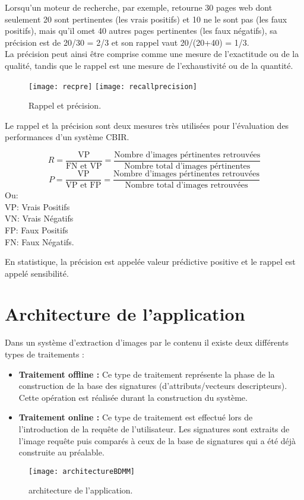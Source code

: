 Lorsqu'un moteur de recherche, par exemple, retourne 30 pages web dont seulement 20 sont pertinentes (les vrais positifs) et 10 ne le sont pas (les faux positifs), mais qu'il omet 40 autres pages pertinentes (les faux négatifs), sa précision est de 20/30 = 2/3 et son rappel vaut 20/(20+40) = 1/3.\\

La précision peut ainsi être comprise comme une mesure de l'exactitude ou de la qualité, tandis que le rappel est une mesure de l'exhaustivité ou de la quantité.\\


\begin{figure}[H]
	\texttt{[image: recpre]} 
	\texttt{[image: recallprecision]} 
	\caption{Rappel et précision.}
\end{figure}
Le rappel et la précision sont deux mesures très utilisées pour l’évaluation des performances d’un système CBIR. 

\begin{equation}
R = \frac{\text{VP}}{\text{FN et VP}} = \frac{\text{Nombre d'images pértinentes retrouvées} }{\text{Nombre total d'images pértinentes}}
\end{equation}
\begin{equation}
P = \frac{\text{VP}}{\text{VP et FP}} = \frac{\text{Nombre d'images pértinentes retrouvées}}{\text{Nombre total d'images retrouvées}}
\end{equation}
Ou: \\
VP: Vrais Positifs\\
VN: Vrais Négatifs\\
FP: Faux Positifs\\
FN: Faux Négatifs.
 
En statistique, la précision est appelée valeur prédictive positive et  le rappel est appelé sensibilité.

\section{Architecture de l’application}
Dans un système d’extraction d’images par le contenu il existe deux différents types de traitements :
\begin{itemize}
	\item \textbf{Traitement offline :}
	Ce type de traitement représente la phase de la construction de la base des signatures (d’attributs/vecteurs descripteurs).
	Cette opération est réalisée durant la construction du système.
	\item \textbf{Traitement online :}
	Ce type de traitement est effectué lors de l’introduction de la requête de l’utilisateur.
	Les signatures sont extraits de l’image requête puis comparés à ceux de la base de signatures qui a été déjà construite au préalable.
\end{itemize}
\begin{figure}[H]
	\centering
	\texttt{[image: architectureBDMM]} 
	\caption{architecture de l’application.}
\end{figure}

